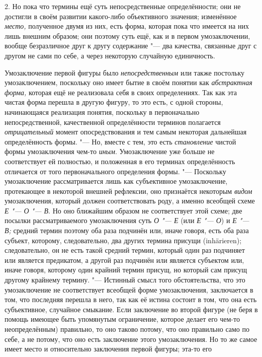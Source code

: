 2. Но пока что термины ещё суть непосредственные
определённости; они не достигли в своём развитии какого-либо объективного
значения; изменённое {\em место,}
полученное двумя из них, есть форма, которая пока что имеется
на них лишь внешним образом; они поэтому суть ещё, как и в
первом умозаключении, вообще безразличное друг к другу содержание
"--- два качества, связанные друг с другом не сами по себе, а
через некоторую случайную единичность.

Умозаключение первой фигуры было {\em непосредственным}
или также постольку умозаключением, поскольку оно имеет бытие
в своём понятии как {\em абстрактная
форма,} которая ещё не реализовала себя в своих
определениях. Так как эта чистая форма перешла в другую фигуру, то это
есть, с одной стороны, начинающаяся реализация понятия, поскольку в
первоначально непосредственной, качественной определённости терминов
полагается {\em отрицательный}
момент опосредствования и тем самым некоторая дальнейшая
определённость формы. "--- Но, вместе с тем, это есть
{\em становление} чистой формы умозаключения чем-то {\em иным}.
Умозаключение уже больше не соответствует ей полностью, и
положенная в его терминах определённость отличается от того первоначального
определения формы. "--- Поскольку умозаключение рассматривается
лишь как субъективное умозаключение, протекающее в некоторой внешней
рефлексии, оно признаётся некоторым {\em видом}
умозаключения, который должен соответствовать роду, а именно
всеобщей схеме {\em Е "--- О "--- В}. Но оно ближайшим
образом не соответствует этой схеме; две посылки рассматриваемого
умозаключения суть {\em О "--- Е} (или {\em Е "--- О}) и
{\em Е "--- В;} средний термин поэтому оба раза подчинён
или, иначе говоря, есть оба раза субъект, которому, следовательно, два
других термина присущи (inhärieren); следовательно, он не
есть такой средний термин, который один раз подчиняет или является
предикатом, а другой раз подчинён или является субъектом или, иначе говоря,
которому один крайний термин присущ, но который сам присущ другому крайнему
термину. "--- Истинный смысл того обстоятельства, что это
умозаключение не соответствует всеобщей форме умозаключения, заключается в
том, что последняя перешла в него, так как её истина состоит в том, что она
есть субъективное, случайное смыкание. Если заключение во второй фигуре (не
беря в помощь имеющее быть упомянутым ограничение, которое делает его
чем-то неопределённым) правильно, то оно таково потому, что оно правильно
само по себе, а не потому, что оно есть заключение этого умозаключения. Но
то же самое имеет место и относительно заключения первой фигуры; эта-то его

